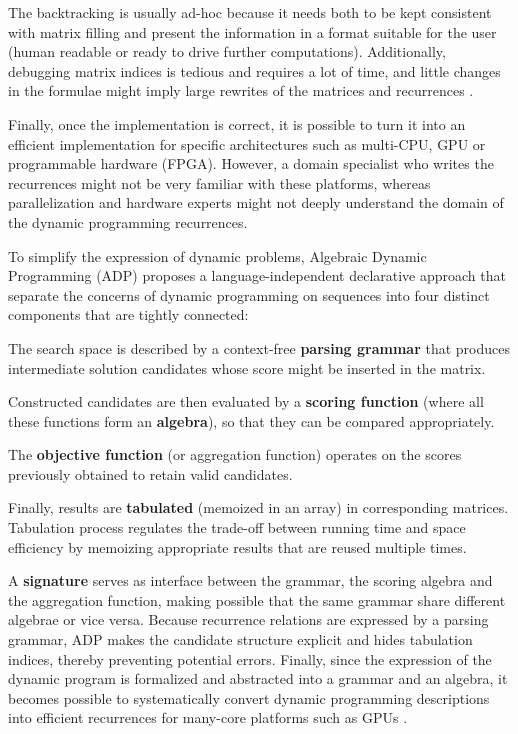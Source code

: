 The backtracking is usually ad-hoc because it needs both to be kept consistent with matrix filling and present the information in a format suitable for the user (human readable or ready to drive further computations). Additionally, debugging matrix indices is tedious and requires a lot of time, and little changes in the formulae might imply large rewrites of the matrices and recurrences \cite{gapc_yield}.

Finally, once the implementation is correct, it is possible to turn it into an efficient implementation for specific architectures such as multi-CPU, GPU or programmable hardware (FPGA). However, a domain specialist who writes the recurrences might not be very familiar with these platforms, whereas parallelization and hardware experts might not deeply understand the domain of the dynamic programming recurrences.

\newpage
To simplify the expression of dynamic problems, Algebraic Dynamic Programming (ADP) \cite{adp} proposes a language-independent declarative approach that separate the concerns of dynamic programming on sequences into four distinct components that are tightly connected:\ol
\item The search space is described by a context-free \textbf{parsing grammar} that produces intermediate solution candidates whose score might be inserted in the matrix.
\item Constructed candidates are then evaluated by a \textbf{scoring function} (where all these functions form an \textbf{algebra}), so that they can be compared appropriately.
\item The \textbf{objective function} (or aggregation function) operates on the scores previously obtained to retain valid candidates.
\item Finally, results are \textbf{tabulated} (memoized in an array) in corresponding matrices. Tabulation process regulates the trade-off between running time and space efficiency by memoizing appropriate results that are reused multiple times.
\ole

A \textbf{signature} serves as interface between the grammar, the scoring algebra and the aggregation function, making possible that the same grammar share different algebrae or vice versa. Because recurrence relations are expressed by a parsing grammar, ADP makes the candidate structure explicit and hides tabulation indices, thereby preventing potential errors. Finally, since the expression of the dynamic program is formalized and abstracted into a grammar and an algebra, it becomes possible to systematically convert dynamic programming descriptions into efficient recurrences for many-core platforms such as GPUs \cite{adp_gpu}.

